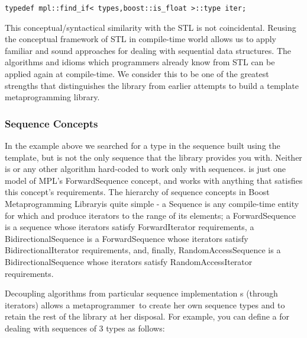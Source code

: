 \documentclass{netobjectdays}
\newcommand{\Mpl}{Boost Meta\-program\-ming Library}
\newcommand{\mpgmer}{meta\-program\-mer}
\begin{document}
{\footnotesize
\begin{verbatim}
typedef mpl::find_if< types,boost::is_float >::type iter;
\end{verbatim}
}

This conceptual/syntactical similarity with the STL is not
coincidental. Reusing the conceptual framework of STL in compile-time
world allows us to apply familiar and sound approaches for dealing
with sequential data structures. The algorithms and idioms which
programmers already know from STL can be applied again at
compile-time. We consider this to be one of the greatest strengths
that distinguishes the library from earlier attempts to build a
template metaprogramming library.

\subsubsection{Sequence Concepts}

In the  example above we searched for a type in the
sequence built using the  template, but
 is not the only sequence that the library provides you
with. Neither is or any other algorithm
hard-coded to work only with  sequences.  is
just one model of MPL's ForwardSequence concept, and  works
with anything that satisfies this concept's requirements. The
hierarchy of sequence concepts in \Mpl is quite simple - a Sequence is
any compile-time entity for which  and 
produce iterators to the range of its elements; a ForwardSequence is a
sequence whose iterators satisfy ForwardIterator requirements, a
BidirectionalSequence is a ForwardSequence whose iterators satisfy
BidirectionalIterator requirements, and, finally, RandomAccessSequence
is a BidirectionalSequence whose iterators satisfy
RandomAccessIterator requirements.

Decoupling algorithms from particular sequence implementation s
(through iterators) allows a \mpgmer\ to create her own sequence types
and to retain the rest of the library at her disposal. For example,
you can define a  for dealing with sequences of 3
types as follows:
\end{document}

